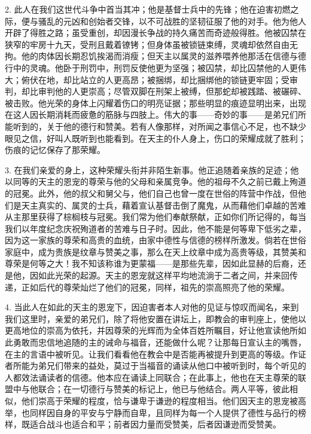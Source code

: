 2. 此人在我们这世代斗争中首当其冲；他是基督士兵中的先锋；他在迫害初燃之际，便与骚乱的元凶和创始者交锋，以不可战胜的坚韧征服了他的对手。他为他人开辟了得胜之路；虽受重创，却因漫长争战的持久痛苦而奇迹般得胜。他被囚禁在狭窄的牢房十九天，受刑且戴着镣铐；但身体虽被锁链束缚，灵魂却依然自由无拘。他的肉体因长期忍饥挨渴而消瘦；但天主以属灵的滋养喂养他那活在信德与德行中的灵魂。他卧于刑罚中，刑罚反使他更为坚强；被囚禁，却比囚禁他的人更伟大；俯伏在地，却比站立的人更高昂；被捆绑，却比捆绑他的锁链更牢固；受审判，却比审判他的人更崇高；尽管双脚在刑架上被缚，但那蛇却被践踏、被碾碎、被击败。他光荣的身体上闪耀着伤口的明亮证据；那些明显的痕迹显明出来，出现在这人因长期消耗而疲惫的筋脉与四肢上。伟大的事——奇妙的事——是弟兄们所能听到的，关于他的德行和赞美。若有人像那样，对所闻之事信心不足，也不缺少眼见之信，好叫人既听到也能看到。在天主的仆人身上，伤口的荣耀成就了胜利；伤痕的记忆保存了那荣耀。\par

3. 在我们亲爱的身上，这种荣耀头衔并非陌生新事。他正追随着亲族的足迹；他以同等的天主的恩宠的尊荣与他的父母和亲属竞争。他的祖母不久之前已戴上殉道的冠冕。此外，他的叔父和舅父与，他们自己也曾一度在世俗的阵营中作战，但他们是天主真实的、属灵的士兵，藉着宣认基督击倒了魔鬼，从而藉他们卓越的苦难从主那里获得了棕榈枝与冠冕。我们常为他们奉献祭献，正如你们所记得的，每当我们以年度纪念庆祝殉道者的苦难与日子时。因此，他不能是何等卑下低劣之辈，因为这一家族的尊荣和高贵的血统，由家中德性与信德的榜样所激发。倘若在世俗家庭中，成为贵族是纹章与赞美之事，那么在天上纹章中成为高贵等级，其赞美和尊荣是何等之大！我不知该称谁为更蒙福——是那些先辈，因如此显赫的后裔，还是他，因如此光荣的起源。天主的恩宠就这样平均地流淌于二者之间，并来回传递，正如后代的尊荣灿烂了他们的冠冕，同样，祖先的崇高照亮了他的荣耀。\par

4. 当此人在如此的天主的恩宠下，因迫害者本人对他的见证与惊叹而闻名，来到我们这里时，亲爱的弟兄们，除了将他安置在讲坛上，即教会的审判座上，使他以更高地位的崇高为依托，并因尊荣的光辉而为全体百姓所瞩目，好让他宣读他所如此勇敢而忠信地追随的主的诫命与福音，还能做什么呢？让那每日宣认主的嘴唇，在主的言语中被听见。让我们看看他在教会中是否能再被提升到更高的等级。作证者所能为弟兄们带来的益处，莫过于当福音的诵读从他口中被听到时，每个听见的人都效法诵读者的信德。他本应在诵读上同联合；在此事上，他也在天主尊荣的联盟中与他联合；在一切德行与赞美的标记上，他已与他结合。两人平等，彼此相似，他们崇高于荣耀的程度，恰与谦卑于谦逊的程度相当。他们因天主的恩宠被高举，也同样因自身的平安与宁静而自卑，且同样为每一个人提供了德性与品行的榜样，既适合战斗也适合和平；前者因力量而受赞美，后者因谦逊而受赞美。\par

